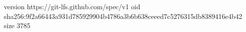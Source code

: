 version https://git-lfs.github.com/spec/v1
oid sha256:9f2a66443a931d785929904b4786a3b6b638ceeed7c5276315db8389416e4b42
size 3785
